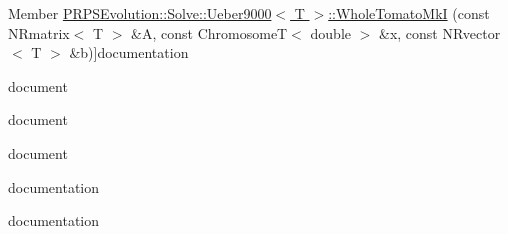 \begin{DoxyRefList}
\hypertarget{todo__todo000014}{}%
\-Member \hyperlink{struct_p_r_p_s_evolution_1_1_solve_1_1_ueber9000_ad148d570d0793171084223e46a01a9c5}{\-P\-R\-P\-S\-Evolution\-:\-:\-Solve\-:\-:\-Ueber9000$<$ \-T $>$\-:\-:\-Whole\-Tomato\-Mk\-I} (const \-N\-Rmatrix$<$ T $>$ \&\-A, const \-Chromosome\-T$<$ double $>$ \&x, const \-N\-Rvector$<$ T $>$ \&b)]documentation  
\item[\label{todo__todo000011}%
\hypertarget{todo__todo000011}{}%
\-Member \hyperlink{struct_p_r_p_s_evolution_1_1_solve_1_1_ueber9000_a31beed300339da3c995c8b2f2ad0bfed}{\-P\-R\-P\-S\-Evolution\-:\-:\-Solve\-:\-:\-Ueber9000$<$ \-T $>$\-:\-:\-Whole\-Tomato\-Mk\-I\-I} (const \-Chromosome\-T$<$ double $>$ \&x)]document  
\item[\label{todo__todo000013}%
\hypertarget{todo__todo000013}{}%
\-Member \hyperlink{struct_p_r_p_s_evolution_1_1_solve_1_1_ueber9000_a58ae6d9699759b02099c1fea85129b2e}{\-P\-R\-P\-S\-Evolution\-:\-:\-Solve\-:\-:\-Ueber9000$<$ \-T $>$\-:\-:\-Whole\-Tomato\-Mk\-I\-I} (const \-Chromosome\-T$<$ double $>$ \&x, const \-Chromosome\-T$<$ int $>$ \&n)]document  
\item[\label{todo__todo000012}%
\hypertarget{todo__todo000012}{}%
\-Member \hyperlink{struct_p_r_p_s_evolution_1_1_solve_1_1_ueber9000_af2fa5a88c143ccb73828a4ff2ca733f9}{\-P\-R\-P\-S\-Evolution\-:\-:\-Solve\-:\-:\-Ueber9000$<$ \-T $>$\-:\-:\-Whole\-Tomato\-Mk\-I\-I} (const \-Chromosome\-T$<$ double $>$ \&x1, const \-Chromosome\-T$<$ double $>$ \&x2)]document  
\item[\label{todo__todo000001}%
\hypertarget{todo__todo000001}{}%
\-Member \hyperlink{struct_p_r_p_s_evolution_1_1_whole_tomato_mk_i___a_aa6857f87dadac3c207d5357071a2b151}{\-P\-R\-P\-S\-Evolution\-:\-:\-Whole\-Tomato\-Mk\-I\-\_\-\-A\-:\-:mk\-I} (const \-N\-Rmatrix$<$ Doub $>$ \&\-A, const \-Search\-Point\-Type \&x, const \-N\-Rvector$<$ Doub $>$ \&b) const ]documentation  
\item[\label{todo__todo000002}%
\hypertarget{todo__todo000002}{}%
\-Member \hyperlink{struct_p_r_p_s_evolution_1_1_whole_tomato_mk_i___b_ad2a8093f8a3db8b8abf74b752e7299cd}{\-P\-R\-P\-S\-Evolution\-:\-:\-Whole\-Tomato\-Mk\-I\-\_\-\-B\-:\-:mk\-I} (const \-N\-Rmatrix$<$ Doub $>$ \&\-A, const \-Search\-Point\-Type \&x, const \-N\-Rvector$<$ Doub $>$ \&b) const ]documentation 
\end{DoxyRefList}